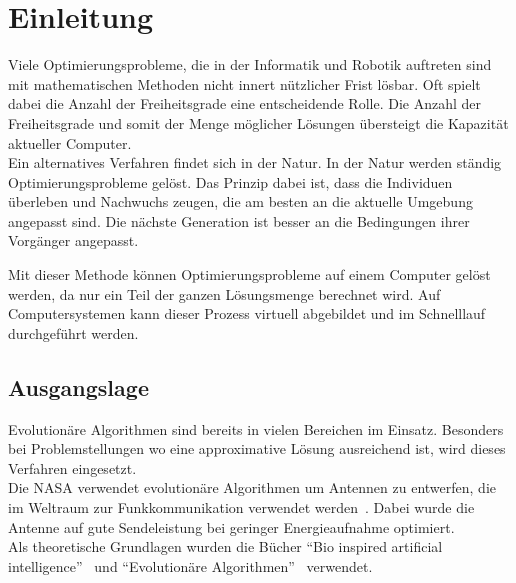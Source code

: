 %
%


\chapter{Einleitung}


  Viele Optimierungsprobleme,
  die in der Informatik und Robotik auftreten sind mit mathematischen Methoden nicht innert nützlicher Frist lösbar.
  Oft spielt dabei die Anzahl der Freiheitsgrade eine entscheidende Rolle.
  Die Anzahl der Freiheitsgrade und somit der Menge möglicher Lösungen übersteigt die Kapazität aktueller Computer.
  \\


  Ein alternatives Verfahren findet sich in der Natur. In der Natur werden ständig Optimierungsprobleme gelöst.
  Das Prinzip dabei ist, dass die Individuen überleben und Nachwuchs zeugen,
  die am besten an die aktuelle Umgebung angepasst sind.
  Die nächste Generation ist besser an die Bedingungen ihrer Vorgänger angepasst. %





  Mit dieser Methode können Optimierungsprobleme auf einem Computer gelöst werden,
  da nur ein Teil der ganzen Lösungsmenge berechnet wird.
  Auf Computersystemen kann dieser Prozess virtuell abgebildet und im Schnelllauf durchgeführt werden.

  \section{Ausgangslage}


    Evolutionäre Algorithmen sind bereits in vielen Bereichen im Einsatz.
    Besonders bei Problemstellungen wo eine approximative Lösung ausreichend ist,
    wird dieses Verfahren eingesetzt.
    \\
    Die NASA verwendet evolutionäre Algorithmen um Antennen zu entwerfen,
    die im Weltraum zur Funkkommunikation verwendet werden~\cite{Hornby2006}.
    Dabei wurde die Antenne auf gute Sendeleistung bei geringer Energieaufnahme optimiert.
    \\
    Als theoretische Grundlagen wurden die Bücher ``Bio inspired artificial intelligence''~\cite{book:bioInspired} und
    ``Evolutionäre Algorithmen''~\cite{book:evAlgo} verwendet.

